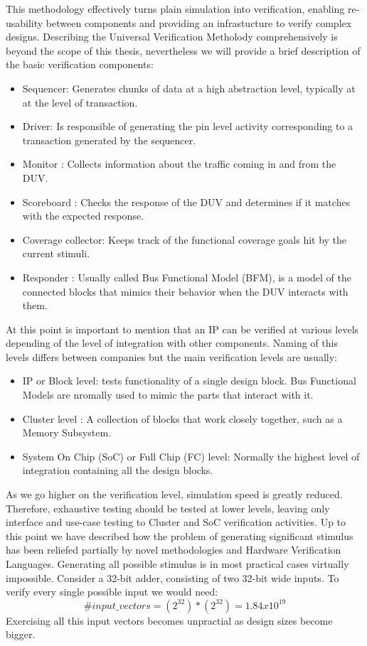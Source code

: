 \documentclass[a4paper,11pt]{article}
\begin{document}
This methodology effectively turns plain simulation into verification, enabling re-usability between components and providing an infrastucture to verify complex designs. Describing the Universal Verification Metholody comprehensively is beyond the scope of this thesis, nevertheless we will provide a brief description of the basic verification components:
\begin{itemize}
\item Sequencer: Generates chunks of data at a high abstraction level, typically at at the level of transaction. 
\item Driver: Is responsible of generating the pin level activity corresponding to a transaction generated by the sequencer. 
\item Monitor : Collects information about the traffic coming in and from the DUV.
\item Scoreboard :  Checks the response of the DUV and determines if it matches with the expected response.
\item Coverage collector: Keeps track of the functional coverage goals hit by the current stimuli.
\item Responder : Usually called Bus Functional Model (BFM), is a model of the connected blocks that mimics their behavior when the DUV interacts with them.
\end{itemize}
At this point is important to mention that an IP can be verified at various levels depending of the level of integration with other components. Naming of this levels differs between companies but the main verification levels are usually:
\begin{itemize}
\item IP or Block level: tests functionality of a single design block. Bus Functional Models are nromally used to mimic the parts that interact with it.
\item Cluster level : A collection of blocks that work closely together, such as a Memory Subsystem. 
\item System On Chip (SoC) or Full Chip (FC) level: Normally the highest level of integration containing all the design blocks.
\end{itemize}
As we go higher on the verification level, simulation speed is greatly reduced. Therefore, exhaustive testing should be tested at lower levels, leaving only interface and use-case testing to Cluster and SoC verification activities. 
Up to this point we have described how the problem of generating significant stimulus has been reliefed partially by novel methodologies and Hardware Verification Languages. Generating all possible stimulus is in most practical cases virtually impossible. Consider a 32-bit adder, consisting of two 32-bit wide inputs. To verify every single possible input we would need:
\begin{equation}
\#input\_vectors = (2^{32}) * (2^{32}) = 1.84 x 10^{19}
\end{equation} 
Exercising all this input vectors becomes unpractial as design sizes become bigger. 
\pagebreak
\end{document}

